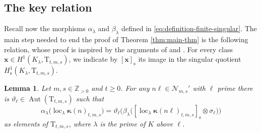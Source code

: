 \documentclass[12pt,reqno]{amsart}
\newtheorem{lemma}[theorem]{Lemma}
\theoremstyle{definition}
\theoremstyle{remark}
\newcommand{\numberset}{\mathbb}
\newcommand{\Z}{\numberset{Z}}
\newcommand{\T}{\boldsymbol{\mathrm{T}}}
\DeclareMathOperator{\Aut}{Aut}
\DeclareMathOperator{\loc}{loc}
\newcommand{\s}{\mathrm{s}}
\newcommand{\ga}{\alpha}
\newcommand{\gk}{\kappa}
\newcommand{\gl}{\lambda}
\begin{document}
\subsection{The key relation}\label{sec:the-key-relation}

Recall now the morphisms $\ga_\gl$ and $\beta_\gl$ defined in \eqref{eq:definition-finite-singular}. The main step needed to end the proof of Theorem \ref{thm:main-thm} is the following relation, whose proof is inspired by the arguments of \cite[§7-9]{Nekovar92:chow-groups} and \cite[§1.7]{Howard04:heegner-point-kolyvagin-system}. For every class $\boldsymbol{x}\in H^1(K_\gl,\T_{t,m,s})$, we indicate by $[\boldsymbol{x}]_{\s}$ its image in the singular quotient $H^1_\s(K_\gl,\T_{t,m,s})$.

\begin{lemma}\label{lem:key-formula}
    Let $m,s\in\Z_{>0}$ and $t\ge 0$. For any $n\ell\in\mathcal{N}_{m,s}'$ with $\ell$ prime there is $\vartheta_\ell\in\Aut(\T_{t,m,s})$ such that
    \begin{equation*}
        \ga_\gl\big(\loc_\gl \boldsymbol{\gk}(n)_{t,m,s}\big)=\vartheta_\ell\Big(\beta_\gl\big([\loc_\gl \boldsymbol{\gk}(n\ell)_{t,m,s}]_{\s}\otimes\sigma_\ell\big)\Big)
    \end{equation*}
    as elements of $\T_{t,m,s}$, where $\gl$ is the prime of $K$ above $\ell$.
\end{lemma}
\end{document}
